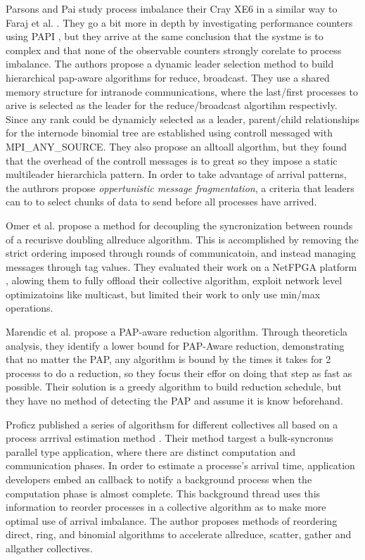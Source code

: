 Parsons and Pai \cite{Parsons2015ExpProcImbMPICollHierarcialSys} study process imbalance their Cray XE6 in a similar way to Faraj et al. \cite{Faraj2008StudyProcArrivalMPIColl}.
They go a bit more in depth by investigating performance counters using PAPI \cite{Mucci1999PAPI}, but they arrive at the same conclusion that the systme is to complex and that none of the observable counters strongly corelate to process imbalance. 
The authors propose a dynamic leader selection method to build hierarchical pap-aware algorithms for reduce, broadcast.
They use a shared memory structure for intranode communications, where the last/first processes to arive is selected as the leader for the reduce/broadcast algortihm respectivly. 
Since any rank could be dynamicly selected as a leader, parent/child relationships for the internode binomial tree are established using controll messaged with MPI\_ANY\_SOURCE. 
They also propose an alltoall algorthm, but they found that the overhead of the controll messages is to great so they impose a static multileader hierarchicla pattern.
In order to take advantage of arrival patterns, the authrors propose \textit{oppertunistic message fragmentation}, a criteria that leaders can to to select chunks of data to send before all processes have arrived.

Omer et al. \cite{Arap2015AdaptiveRDForCC} propose a method for decoupling the syncronization between rounds of a recurisve doubling allreduce algorithm. 
This is accomplished by removing the strict ordering imposed through rounds of communicatoin, and instead managing messages through tag values.
They evaluated their work on a NetFPGA platform \cite{Lockwood2007NetFPGA}, alowing them to fully offload their collective algorithm, exploit network level optimizatoins like multicast, but limited their work to only use min/max operations.

Marendic et al. \cite{Marendic2016Clairvoyant} propose a PAP-aware reduction algorithm.
Through theoreticla analysis, they identify a lower bound for PAP-Aware reduction, demonstrating that no matter the PAP, any algorithm is bound by the times it takes for 2 processs to do a reduction, so they focus their effor on doing that step as fast as possible. 
Their solution is a greedy algorithm to build reduction schedule, but they have no method of detecting the PAP and assume it is know beforehand.

Proficz published a series of algorithsm for different collectives all based on a process arrrival estimation method \cite{Proficz2018ImprvAllReduceForImbPAP, Proficz2020PAPAwareScatterGather, Proficz2021AllGatherResilientToImbPAP}.
Their method targest a bulk-syncronus parallel type application, where there are distinct computation and communication phases.
In order to estimate a processe's arrival time, application developers embed an callback to notify a background process when the computation phase is almost complete.
This background thread uses this information to reorder processes in a collective algorithm as to make more optimal use of arrival imbalance.
The author proposes methods of reordering direct, ring, and binomial algorithms to accelerate allreduce, scatter, gather and allgather collectives.

